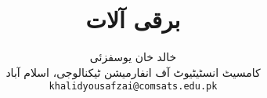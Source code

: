 \documentclass[leqno,b5paper]{book}
\author{
خالد خان یوسفزئی\\
{\small {کامسیٹ انسٹیٹیوٹ آف انفارمیشن ٹیکنالوجی، اسلام آباد}}\\
\texttt{khalidyousafzai@comsats.edu.pk}
}
\title{برقی آلات}
\date{}                           %
\begin{document}
\begin{urdufont}

\renewcommand*{\contentsname}{عنوان}    %

\frontmatter                          %

\maketitle

\tableofcontents
\pagestyle{empty}
%



\mainmatter                      %

\pagestyle{headings}

 












\backmatter

\renewcommand*{\indexname}{فرہنگ}      %
\cleardoublepage
{}

\end{urdufont}
\end{document}
